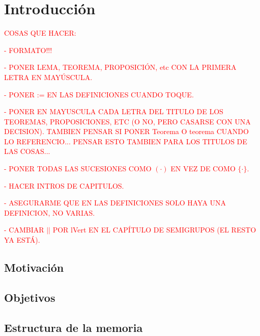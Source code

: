 \chapter*{Introducción}
\label{ch:introduccion}

%
%
%

\textcolor{red}{COSAS QUE HACER:}

\textcolor{red}{- FORMATO!!!}

\textcolor{red}{- PONER LEMA, TEOREMA, PROPOSICIÓN, etc CON LA PRIMERA LETRA EN MAYÚSCULA.}

\textcolor{red}{- PONER := EN LAS DEFINICIONES CUANDO TOQUE.}

\textcolor{red}{- PONER EN MAYUSCULA CADA LETRA DEL TITULO DE LOS TEOREMAS, PROPOSICIONES, ETC (O NO, PERO CASARSE CON UNA DECISION). TAMBIEN PENSAR SI PONER Teorema O teorema CUANDO LO REFERENCIO... PENSAR ESTO TAMBIEN PARA LOS TITULOS DE LAS COSAS...}

\textcolor{red}{- PONER TODAS LAS SUCESIONES COMO $( \cdot )$ EN VEZ DE COMO $\{ \cdot \}$.}

\textcolor{red}{- HACER INTROS DE CAPITULOS.}

\textcolor{red}{- ASEGURARME QUE EN LAS DEFINICIONES SOLO HAYA UNA DEFINICION, NO VARIAS.}

\textcolor{red}{- CAMBIAR $||$ POR lVert EN EL CAPÍTULO DE SEMIGRUPOS (EL RESTO YA ESTÁ).}

\section*{Motivación}


\section*{Objetivos}


\section*{Estructura de la memoria}
